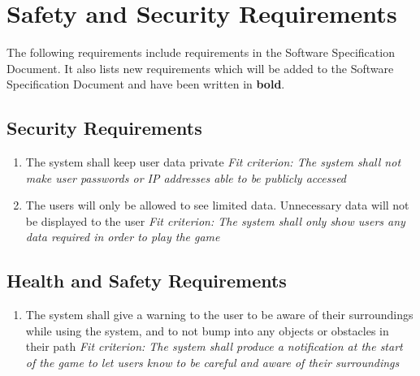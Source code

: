 \documentclass{article}
\begin{document}
\section{Safety and Security Requirements}

The following requirements include requirements in the Software Specification
Document. It also lists new requirements which will be added to the Software
Specification Document and have been written in \textbf{bold}.

\subsection{Security Requirements}
\begin{enumerate}[SR\arabic*.]
    \item The system shall keep user data private\newline
    \textit{Fit criterion: The system shall not make user passwords or IP addresses able to be publicly accessed}
    \item The users will only be allowed to see limited data. Unnecessary data will not be displayed to the user\newline
    \textit{Fit criterion: The system shall only show users any data required in order to play the game}

\end{enumerate}

\subsection{Health and Safety Requirements}
\begin{enumerate}[HS\arabic*.]
    \item The system shall give a warning to the user to be aware of their surroundings while using the system, and to not bump into any objects or obstacles in their path\newline
    \textit{Fit criterion: The system shall produce a notification at the start of the game to let users know to be careful and aware of their surroundings}
\end{enumerate}
\end{document}
